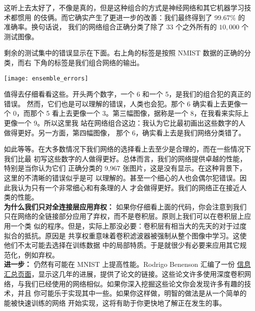 这听上去太好了，不像是真的，但是这种组合的方式是神经网络和其它机器学习技术都惯用
的伎俩。而它确实产生了更进一步的改善：我们最终得到了 99.67\% 的准确率。换句话说，
我们的网络组合正确分类了除了 $33$ 个之外所有的 $10,000$ 个测试图像。

剩余的测试集中的错误显示在下面。右上角的标签是按照 NMIST 数据的正确的分类，而右
下角的标签是我们组合网络的输出。
\begin{center}
  \texttt{[image: ensemble\_errors]}
\end{center}

值得去仔细看看这些。开头两个数字，一个 6 和一个 5，是我们的组合犯的真正的错误。
然而，它们也是可以理解的错误，人类也会犯。那个 6 确实看上去更像一个 0，而那个 5
看上去更像一个 3。第三幅图像，据称是一个 8，在我看来实际上更像一个 9。所以这里我
站在网络组合这边：我认为它比最初画出这些数字的人做得更好。另一方面，第四幅图像，
那个 6，确实看上去是我们网络分类错了。

如此等等。在大多数情况下我们网络的选择看上去至少是合理的，而在一些情况下我们比最
初写这些数字的人做得更好。总体而言，我们的网络提供卓越的性能，特别是当你认为它们
正确分类的 9,967 张图片，这是没有显示。在这种背景下，这里的不清晰的错误似乎是可
以理解的。甚至一个细心的人也会偶尔犯错误。因此我认为只有一个非常细心和有条理的人
才会做得更好。我们的网络正在接近人类的性能。\\

\textbf{为什么我们只对全连接层应用弃权：} 如果你仔细看上面的代码，你会注意到我们
只在网络的全链接部分应用了弃权，而不是卷积层。原则上我们可以在卷积层上应用一个类
似的程序。但是，实际上那没必要：卷积层有相当大的先天的对于过度拟合的抵抗。原因是
共享权重意味着卷积滤波器被强制从整个图像中学习。这使他们不太可能去选择在训练数据
中的局部特质。于是就很少有必要来应用其它规范化，例如弃权。\\

\textbf{进一步：} 仍然有可能在 MNIST 上提高性能。Rodrigo Benenson 汇编了一份%
\href{http://rodrigob.github.io/are_we_there_yet/build/classification_datasets_results.html}{%
  信息汇总页面}，显示这几年的进展，提供了论文的链接。这些论文许多使用深度卷积网
络，与我们已经使用的网络相似。如果你深入挖掘这些论文你会发现许多有趣的技术，并且
你可能乐于实现其中一些。如果你这样做，明智的做法是从一个简单的能被快速训练的网络
开始实现，这将有助于你更快地了解正在发生的事。

